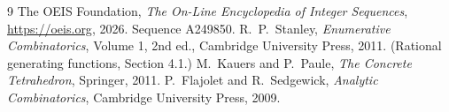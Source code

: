 \documentclass[11pt,a4paper]{article}
\theoremstyle{plain}
\theoremstyle{definition}
\begin{document}
\begin{thebibliography}{9}
 The OEIS Foundation, \emph{The On-Line Encyclopedia of Integer
Sequences}, \url{https://oeis.org}, 2026. Sequence A249850.
 R.~P.~Stanley, \emph{Enumerative Combinatorics}, Volume 1, 2nd ed.,
Cambridge University Press, 2011. (Rational generating functions, Section 4.1.)
 M.~Kauers and P.~Paule, \emph{The Concrete Tetrahedron}, Springer, 2011.
 P.~Flajolet and R.~Sedgewick, \emph{Analytic Combinatorics}, Cambridge
University Press, 2009.
\end{thebibliography}
\end{document}
